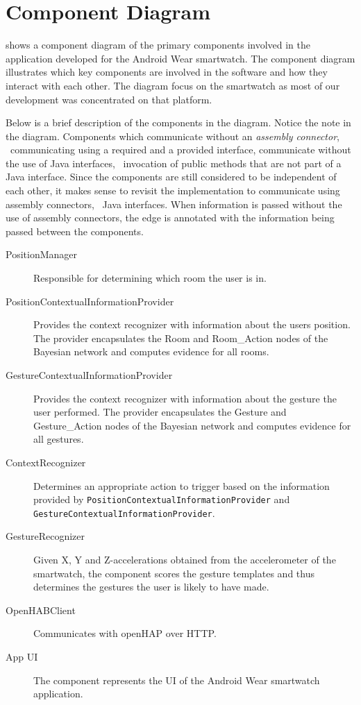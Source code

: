 \section{Component Diagram}
\label{sec:implementation:component-diagram}

 shows a component diagram of the primary components involved in the application developed for the Android Wear smartwatch. The component diagram illustrates which key components are involved in the software and how they interact with each other.
The diagram focus on the smartwatch as most of our development was concentrated on that platform.

Below is a brief description of the components in the diagram. Notice the note in the diagram. Components which communicate without an \emph{assembly connector}, \ie~communicating using a required and a provided interface, communicate without the use of Java interfaces, \eg~invocation of public methods that are not part of a Java interface. Since the components are still considered to be independent of each other, it makes sense to revisit the implementation to communicate using assembly connectors, \ie~Java interfaces. When information is passed without the use of assembly connectors, the edge is annotated with the information being passed between the components.

\begin{description}
\item[PositionManager] Responsible for determining which room the user is in.
\item[PositionContextualInformationProvider] Provides the context recognizer with information about the users position. The provider encapsulates the Room and Room\_Action nodes of the Bayesian network and computes evidence for all rooms.
\item[GestureContextualInformationProvider] Provides the context recognizer with information about the gesture the user performed. The  provider encapsulates the Gesture and Gesture\_Action nodes of the Bayesian network and computes evidence for all gestures.
\item[ContextRecognizer] Determines an appropriate action to trigger based on the information provided by \texttt{PositionContextualInformationProvider} and \texttt{GestureContextualInformationProvider}.
\item[GestureRecognizer] Given X, Y and Z-accelerations obtained from the accelerometer of the smartwatch, the component scores the gesture templates and thus determines the gestures the user is likely to have made.
\item[OpenHABClient] Communicates with openHAP over HTTP.
\item[App UI] The component represents the UI of the Android Wear smartwatch application.
\end{description}

